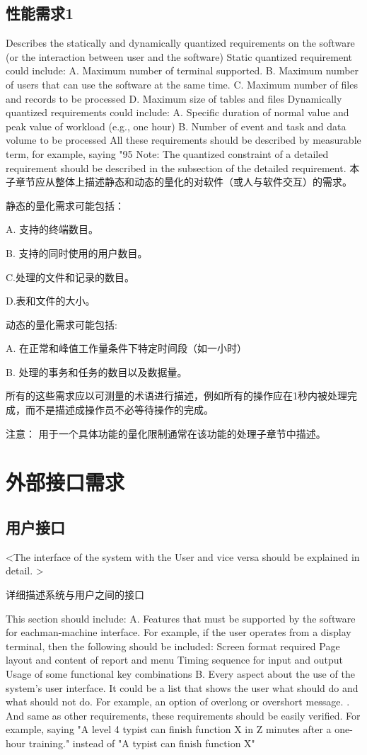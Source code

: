 \subsection{性能需求1}
Describes the statically and dynamically quantized requirements on the software (or the interaction between user and the software)
Static quantized requirement could include:
A. Maximum number of terminal supported.
B. Maximum number of users that can use the software at the same time.
C. Maximum number of files and records to be processed
D. Maximum size of  tables and files
Dynamically quantized requirements could include:
A. Specific duration of normal value and peak value of workload (e.g., one hour)
B. Number of event and task and data volume to be processed 
All these requirements should be described by measurable term, for example, saying "95%
Note: The quantized constraint of a detailed requirement should be described in the subsection of the detailed requirement.
本子章节应从整体上描述静态和动态的量化的对软件（或人与软件交互）的需求。

静态的量化需求可能包括：

A. 支持的终端数目。

B. 支持的同时使用的用户数目。

C.处理的文件和记录的数目。

D.表和文件的大小。

动态的量化需求可能包括:

A. 在正常和峰值工作量条件下特定时间段（如一小时）

B. 处理的事务和任务的数目以及数据量。

所有的这些需求应以可测量的术语进行描述，例如所有的操作应在1秒内被处理完成，而不是描述成操作员不必等待操作的完成。

注意： 用于一个具体功能的量化限制通常在该功能的处理子章节中描述。
\section{外部接口需求}
\subsection{用户接口}
<The interface of the system with the User and vice versa should be explained in detail. >

详细描述系统与用户之间的接口

This section should include:
A. Features that must be supported by the software for eachman-machine interface. For example, if the user operates from a display terminal, then the following should be included:
		Screen format required
		Page layout and content of report and menu
		Timing sequence for input and output
		Usage of some functional key combinations
B. Every aspect about the use of the system's user interface. It could be a list that shows the user what should do and what should not do.  For example, an option of overlong or overshort message. . And same as other requirements, these requirements should be easily verified. For example, saying "A level 4 typist can finish function X in Z minutes after a one-hour training." instead of "A typist can finish function X"	

